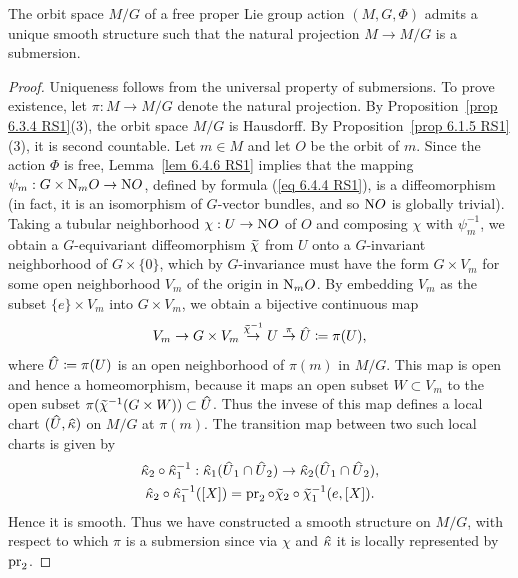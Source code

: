 \begin{cor}[{{\cite[Cor.~6.5.1]{RS1}}}]\label{cor 6.5.1 RS1}
    The orbit space $M\slash G$ of a free proper Lie group action $(M,G,\Phi)$ admits a unique smooth structure such that the natural projection $M\to M\slash G$ is a submersion.
\end{cor}
\begin{proof}
    Uniqueness follows from the universal property of submersions. To prove existence, let $\pi:M\to M\slash G$ denote the natural projection. By Proposition~\ref{prop 6.3.4 RS1}(3), the orbit space $M\slash G$ is Hausdorff. By Proposition~\ref{prop 6.1.5 RS1}(3), it is second countable. Let $m\in M$ and let $O$ be the orbit of $m$. Since the action $\Phi$ is free, Lemma~\ref{lem 6.4.6 RS1} implies that the mapping $\psi_m:G\times \mathrm{N}_m O\to \mathrm{N} O$, defined by formula (\ref{eq 6.4.4 RS1}), is a diffeomorphism (in fact, it is an isomorphism of $G$-vector bundles, and so $\mathrm{N} O$ is globally trivial). Taking a tubular neighborhood $\chi:U\to \mathrm{N} O$ of $O$ and composing $\chi$ with $\psi_m^{-1}$, we obtain a $G$-equivariant diffeomorphism $\wt\chi$ from $U$ onto a $G$-invariant neighborhood of $G\times\{0\}$, which by $G$-invariance must have the form $G\times V_m$ for some open neighborhood $V_m$ of the origin in $\mathrm{N}_mO$. By embedding $V_m$ as the subset $\{e\}\times V_m$ into $G\times V_m$, we obtain a bijective continuous map
    \[V_m\to G\times V_m\overset{\wt{\chi}^{-1}}{\to}U\overset{\pi}{\to}\wh{U}\coloneqq \pi(U),\]
    where $\wh{U}\coloneqq \pi(U)$ is an open neighborhood of $\pi(m)$ in $M\slash G$. This map is open and hence a homeomorphism, because it maps an open subset $W\subset V_m$ to the open subset $\pi(\wt{\chi}^{-1}(G\times W))\subset \wh{U}$. Thus the invese of this map defines a local chart $(\wh U,\wh \kappa)$ on $M\slash G$ at $\pi(m)$. The transition map between two such local charts is given by
    \begin{gather}
        \wh{\kappa}_2\circ\wh{\kappa}_1^{-1}:\wh{\kappa}_1(\wh{U}_1\cap \wh{U}_2)\to \wh{\kappa}_2(\wh{U}_1\cap \wh{U}_2),\\
        \wh{\kappa}_2\circ\wh{\kappa}_1^{-1}([X])=\pr_2\circ\wt{\chi}_2\circ\wt{\chi}_1^{-1}(e,[X]).
    \end{gather}
    Hence it is smooth. Thus we have constructed a smooth structure on $M\slash G$, with respect to which $\pi$ is a submersion since via $\chi$ and $\wh\kappa$ it is locally represented by $\operatorname{pr}_2$.
\end{proof}


